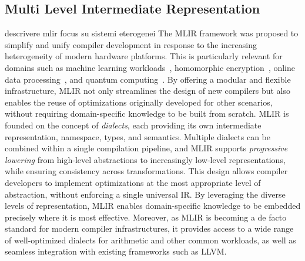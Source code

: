\subsection{Multi Level Intermediate Representation}
descrivere mlir focus su sistemi eterogenei
\cite{MLIR_lattner}
The MLIR framework was proposed to simplify and unify compiler development in response to the increasing heterogeneity of modern hardware platforms\cite{MLIR_lattner}. This is particularly relevant for domains such as machine learning workloads~\cite{}, homomorphic encryption~\cite{}, online data processing~\cite{}, and quantum computing~\cite{}. By offering a modular and flexible infrastructure, MLIR not only streamlines the design of new compilers but also enables the reuse of optimizations originally developed for other scenarios, without requiring domain-specific knowledge to be built from scratch.
MLIR is founded on the concept of \textit{dialects}, each providing its own intermediate representation, namespace, types, and semantics. Multiple dialects can be combined within a single compilation pipeline, and MLIR supports \textit{progressive lowering} from high-level abstractions to increasingly low-level representations, while ensuring consistency across transformations.
This design allows compiler developers to implement optimizations at the most appropriate level of abstraction, without enforcing a single universal IR. By leveraging the diverse levels of representation, MLIR enables domain-specific knowledge to be embedded precisely where it is most effective. Moreover, as MLIR is becoming a de facto standard for modern compiler infrastructures, it provides access to a wide range of well-optimized dialects for arithmetic and other common workloads, as well as seamless integration with existing frameworks such as LLVM\cite{}. 